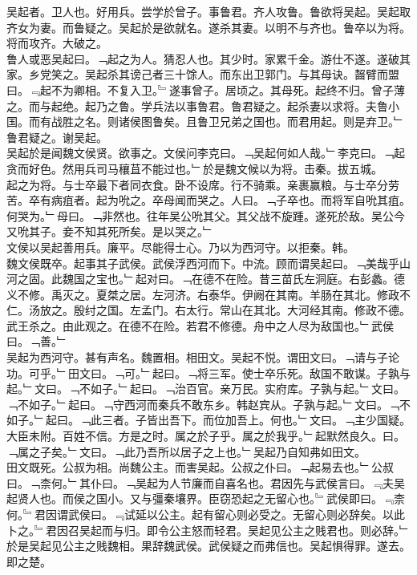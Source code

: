 \documentclass{zhvt-classic}
\begin{document}
\hspace*{2em}吴起者。卫人也。好用兵。尝学於曾子。事鲁君。齐人攻鲁。鲁欲将吴起。吴起取齐女为妻。而鲁疑之。吴起於是欲就名。遂杀其妻。以明不与齐也。鲁卒以为将。将而攻齐。大破之。\\
\hspace*{2em}鲁人或恶吴起曰。﹁起之为人。猜忍人也。其少时。家累千金。游仕不遂。遂破其家。乡党笑之。吴起杀其谤己者三十馀人。而东出卫郭门。与其母诀。齧臂而盟曰。﹃起不为卿相。不复入卫。﹄遂事曾子。居顷之。其母死。起终不归。曾子薄之。而与起绝。起乃之鲁。学兵法以事鲁君。鲁君疑之。起杀妻以求将。夫鲁小国。而有战胜之名。则诸侯图鲁矣。且鲁卫兄弟之国也。而君用起。则是弃卫。﹂鲁君疑之。谢吴起。\\
\hspace*{2em}吴起於是闻魏文侯贤。欲事之。文侯问李克曰。﹁吴起何如人哉。﹂李克曰。﹁起贪而好色。然用兵司马穰苴不能过也。﹂於是魏文候以为将。击秦。拔五城。\\
\hspace*{2em}起之为将。与士卒最下者同衣食。卧不设席。行不骑乘。亲裹赢粮。与士卒分劳苦。卒有病疽者。起为吮之。卒母闻而哭之。人曰。﹁子卒也。而将军自吮其疽。何哭为。﹂母曰。﹁非然也。往年吴公吮其父。其父战不旋踵。遂死於敌。吴公今又吮其子。妾不知其死所矣。是以哭之。﹂\\
\hspace*{2em}文侯以吴起善用兵。廉平。尽能得士心。乃以为西河守。以拒秦。韩。\\
\hspace*{2em}魏文侯既卒。起事其子武侯。武侯浮西河而下。中流。顾而谓吴起曰。﹁美哉乎山河之固。此魏国之宝也。﹂起对曰。﹁在德不在险。昔三苗氏左洞庭。右彭蠡。德义不修。禹灭之。夏桀之居。左河济。右泰华。伊阙在其南。羊肠在其北。修政不仁。汤放之。殷纣之国。左孟门。右太行。常山在其北。大河经其南。修政不德。武王杀之。由此观之。在德不在险。若君不修德。舟中之人尽为敌国也。﹂武侯曰。﹁善。﹂\\
\hspace*{2em}吴起为西河守。甚有声名。魏置相。相田文。吴起不悦。谓田文曰。﹁请与子论功。可乎。﹂田文曰。﹁可。﹂起曰。﹁将三军。使士卒乐死。敌国不敢谋。子孰与起。﹂文曰。﹁不如子。﹂起曰。﹁治百官。亲万民。实府库。子孰与起。﹂文曰。﹁不如子。﹂起曰。﹁守西河而秦兵不敢东乡。韩赵宾从。子孰与起。﹂文曰。﹁不如子。﹂起曰。﹁此三者。子皆出吾下。而位加吾上。何也。﹂文曰。﹁主少国疑。大臣未附。百姓不信。方是之时。属之於子乎。属之於我乎。﹂起默然良久。曰。﹁属之子矣。﹂文曰。﹁此乃吾所以居子之上也。﹂吴起乃自知弗如田文。\\
\hspace*{2em}田文既死。公叔为相。尚魏公主。而害吴起。公叔之仆曰。﹁起易去也。﹂公叔曰。﹁柰何。﹂其仆曰。﹁吴起为人节廉而自喜名也。君因先与武侯言曰。﹃夫吴起贤人也。而侯之国小。又与彊秦壤界。臣窃恐起之无留心也。﹄武侯即曰。﹃柰何。﹄君因谓武侯曰。﹃试延以公主。起有留心则必受之。无留心则必辞矣。以此卜之。﹄君因召吴起而与归。即令公主怒而轻君。吴起见公主之贱君也。则必辞。﹂於是吴起见公主之贱魏相。果辞魏武侯。武侯疑之而弗信也。吴起惧得罪。遂去。即之楚。\\
\end{document}
